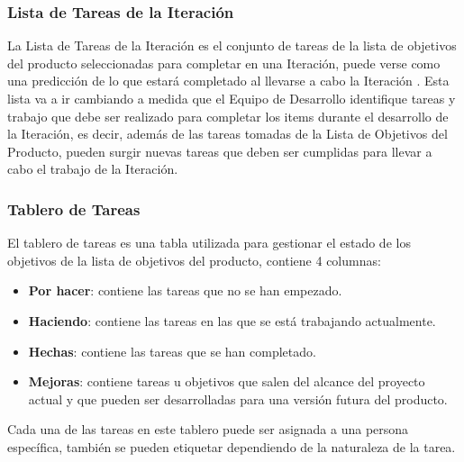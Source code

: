 \subsubsection{Lista de Tareas de la Iteración}
La Lista de Tareas de la Iteración es el conjunto de tareas de la lista de objetivos del producto seleccionadas para completar en una Iteración, puede verse como una predicción de lo que estará completado al llevarse a cabo la Iteración \cite{scrumSchwaber}. Esta lista va a ir cambiando a medida que el Equipo de Desarrollo identifique tareas y trabajo que debe ser realizado para completar los items durante el desarrollo de la Iteración, es decir, además de las tareas tomadas de la Lista de Objetivos del Producto, pueden surgir nuevas tareas que deben ser cumplidas para llevar a cabo el trabajo de la Iteración.

\subsubsection{Tablero de Tareas}
El tablero de tareas es una tabla utilizada para gestionar el estado de los objetivos de la lista de objetivos del producto, contiene 4 columnas:

\begin{itemize}
    \item \textbf{Por hacer}: contiene las tareas que no se han empezado.
    \item \textbf{Haciendo}: contiene las tareas en las que se está trabajando actualmente.
    \item \textbf{Hechas}: contiene las tareas que se han completado.
    \item \textbf{Mejoras}: contiene tareas u objetivos que salen del alcance del proyecto actual y que pueden ser desarrolladas para una versión futura del producto.
\end{itemize}

Cada una de las tareas en este tablero puede ser asignada a una persona específica, también se pueden etiquetar dependiendo de la naturaleza de la tarea.